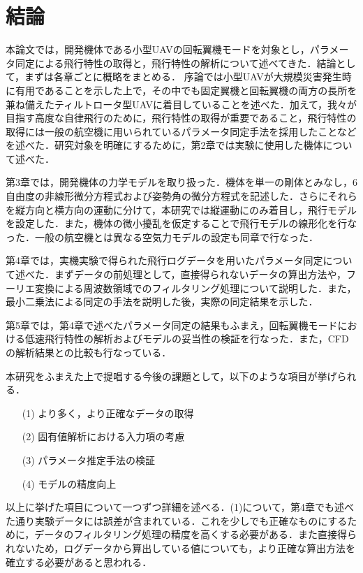 
\chapter{結論}
\label{conclusion}

本論文では，開発機体である小型UAVの回転翼機モードを対象とし，パラメータ同定による飛行特性の取得と，飛行特性の解析について述べてきた．結論として，まずは各章ごとに概略をまとめる．
序論では小型UAVが大規模災害発生時に有用であることを示した上で，その中でも固定翼機と回転翼機の両方の長所を兼ね備えたティルトロータ型UAVに着目していることを述べた．加えて，我々が目指す高度な自律飛行のために，飛行特性の取得が重要であること，飛行特性の取得には一般の航空機に用いられているパラメータ同定手法を採用したことなどを述べた．研究対象を明確にするために，第2章では実験に使用した機体について述べた．

第3章では，開発機体の力学モデルを取り扱った．機体を単一の剛体とみなし，6自由度の非線形微分方程式および姿勢角の微分方程式を記述した．さらにそれらを縦方向と横方向の運動に分けて，本研究では縦運動にのみ着目し，飛行モデルを設定した．また，機体の微小擾乱を仮定することで飛行モデルの線形化を行なった．一般の航空機とは異なる空気力モデルの設定も同章で行なった．

第4章では，実機実験で得られた飛行ログデータを用いたパラメータ同定について述べた．まずデータの前処理として，直接得られないデータの算出方法や，フーリエ変換による周波数領域でのフィルタリング処理について説明した．また，最小二乗法による同定の手法を説明した後，実際の同定結果を示した．

第5章では，第4章で述べたパラメータ同定の結果もふまえ，回転翼機モードにおける低速飛行特性の解析およびモデルの妥当性の検証を行なった．また，CFDの解析結果との比較も行なっている．

\vspace{5pt}

本研究をふまえた上で提唱する今後の課題として，以下のような項目が挙げられる．
\begin{itemize}
  \item[(1)] より多く，より正確なデータの取得
  \item[(2)] 固有値解析における入力項の考慮
  \item[(3)] パラメータ推定手法の検証
  \item[(4)] モデルの精度向上
\end{itemize}

以上に挙げた項目について一つずつ詳細を述べる．(1)について，第4章でも述べた通り実験データには誤差が含まれている．これを少しでも正確なものにするために，データのフィルタリング処理の精度を高くする必要がある．また直接得られないため，ログデータから算出している値についても，より正確な算出方法を確立する必要があると思われる．

